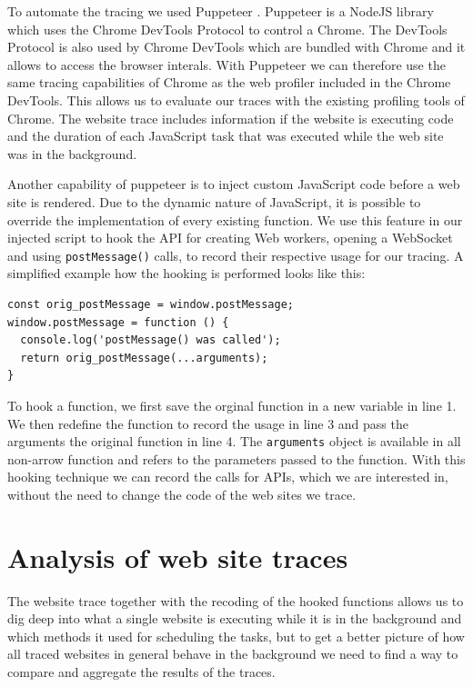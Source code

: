 \documentclass[
	ngerman,
	ruledheaders=section,%
	class=report,%
	thesis={type=bachelor},%
	accentcolor=9c,%
	custommargins=true,%
	marginpar=false,%
	parskip=half-,%
	fontsize=11pt,%
]{tudapub}
\begin{document}
  To automate the tracing we used Puppeteer \cite{pptr}. Puppeteer is a NodeJS library which uses the Chrome DevTools Protocol \cite{chrome-devtools-protocol} to control a Chrome. The DevTools Protocol is also used by Chrome DevTools which are bundled with Chrome and it allows to access the browser interals. With Puppeteer we can therefore use the same tracing capabilities of Chrome as the web profiler included in the Chrome DevTools. This allows us to evaluate our traces with the existing profiling tools of Chrome. The website trace includes information if the website is executing code and the duration of each JavaScript task that was executed while the web site was in the background.

  Another capability of puppeteer is to inject custom JavaScript code before a web site is rendered. Due to the dynamic nature of JavaScript, it is possible to override the implementation of every existing function. We use this feature in our injected script to hook the API for creating Web workers, opening a WebSocket and using \texttt{postMessage()} calls, to record their respective usage for our tracing. A simplified example how the hooking is performed looks like this:

\begin{lstlisting}
const orig_postMessage = window.postMessage;
window.postMessage = function () {
  console.log('postMessage() was called');
  return orig_postMessage(...arguments);
}
\end{lstlisting}

  To hook a function, we first save the orginal function in a new variable in line 1. We then redefine the function to record the usage in line 3 and pass the arguments the original function in line 4. The \texttt{arguments} object is available in all non-arrow function and refers to the parameters passed to the function. With this hooking technique we can record the calls for APIs, which we are interested in, without the need to change the code of the web sites we trace.

  \section{Analysis of web site traces}
  \label{sec:trace-analysis}

  The website trace together with the recoding of the hooked functions allows us to dig deep into what a single website is executing while it is in the background and which methods it used for scheduling the tasks, but to get a better picture of how all traced websites in general behave in the background we need to find a way to compare and aggregate the results of the traces. 
\end{document}
